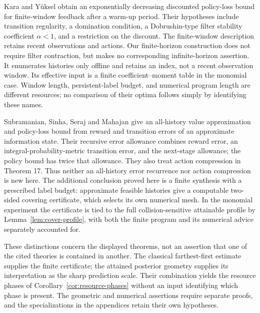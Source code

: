 Kara and Y\"uksel \cite[Assumption 4 and Theorem 12]{KaraYuksel}
obtain an exponentially decreasing discounted policy-loss bound for
finite-window feedback after a warm-up period. Their hypotheses include
transition regularity, a domination condition, a Dobrushin-type filter
stability coefficient $\alpha<1$, and a restriction on the discount.
The finite-window description retains recent observations and actions.
Our finite-horizon construction does not require filter contraction,
but makes no corresponding infinite-horizon assertion. It enumerates
histories only offline and retains an index, not a recent observation
window. Its effective input is a finite coefficient--moment table in
the monomial case. Window length, persistent-label budget, and numerical
program length are different resources; no comparison of their optima
follows simply by identifying these names.

Subramanian, Sinha, Seraj and Mahajan
\cite[Definition 7 and Theorem 9]{Subramanian} give an all-history
value approximation and policy-loss bound from reward and transition
errors of an approximate information state. Their recursive error
allowance combines reward error, an integral-probability-metric transition
error, and the next-stage allowance; the policy bound has twice that
allowance. They also treat action compression in Theorem 17. Thus
neither an all-history error recurrence nor action compression is new
here. The additional conclusion proved here is a finite synthesis with
a prescribed label budget: approximate feasible histories give a
computable two-sided covering certificate, which selects its own
numerical mesh. In the monomial experiment the certificate is tied to
the full collision-sensitive attainable profile by
Lemma~\ref{lem:cover-profile}, with both the finite program and its
numerical advice separately accounted for.

These distinctions concern the displayed theorems, not an assertion that
one of the cited theories is contained in another. The classical
farthest-first estimate supplies the finite certificate; the attained
posterior geometry supplies its interpretation as the sharp prediction
scale. Their combination yields the resource phases of
Corollary~\ref{cor:resource-phases} without an input identifying which
phase is present. The geometric and numerical assertions require separate
proofs, and the specializations in the appendices retain their own
hypotheses.


